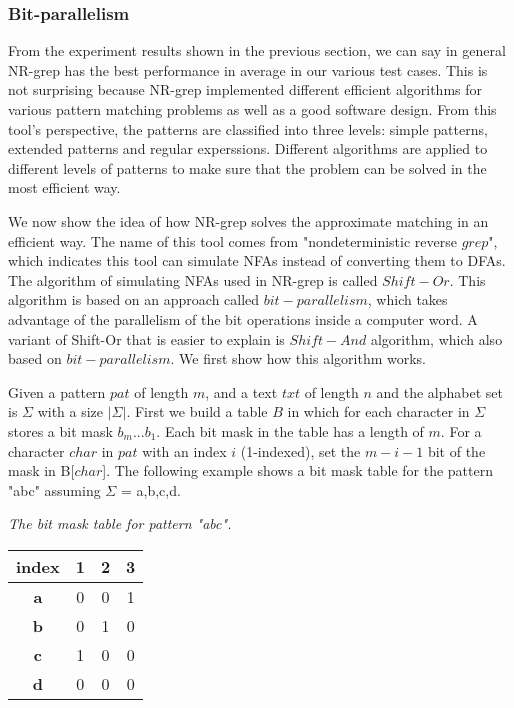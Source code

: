 \subsubsection{Bit-parallelism}
From the experiment results shown in the previous section, we can say in general NR-grep has the best performance in average in our various test cases. This is not surprising because NR-grep implemented different efficient algorithms for various pattern matching problems as well as a good software design. From this tool's perspective, the patterns are classified into three levels: simple patterns, extended patterns and regular experssions. Different algorithms are applied to different levels of patterns to make sure that the problem can be solved in the most efficient way. 

We now show the idea of how NR-grep solves the approximate matching in an efficient way. The name of this tool comes from "nondeterministic reverse $grep$", which indicates this tool can simulate NFAs instead of converting them to DFAs. The algorithm of  simulating NFAs used in NR-grep is called $Shift-Or$. This algorithm is based on an approach called $bit-parallelism$, which takes advantage of the parallelism of the bit operations inside a computer word. A variant of Shift-Or that is easier to explain is $Shift-And$ algorithm, which also based on $bit-parallelism$. We first show how this algorithm works. 

Given a pattern $pat$ of length $m$,  and a text $txt$ of length $n$ and the alphabet set is $\Sigma$ with a size $|\Sigma|$. First we build a table $B$ in which for each character in $\Sigma$ stores a bit mask $b_m...b_1$. Each bit mask in the table has a length of $m$. For a character $char$ in $pat$ with an index $i$ (1-indexed), set the $m-i-1$ bit of the mask in B[$char$]. The following example shows a bit mask table for the pattern "abc" assuming $\Sigma$ = {a,b,c,d}.


\begin{example}\emph{The bit mask table for pattern "abc".}

\begin{table}[H]
	\centering
	\begin{tabular}{|c|c|c|c|}
		\hline
		index      & 1                        & 2                        & 3                        \\ \hline
		\textbf{a} & 0                        & 0                        & {\color[HTML]{3531FF} 1} \\ \hline
		\textbf{b} & 0                        & {\color[HTML]{3531FF} 1} & 0                        \\ \hline
		\textbf{c} & {\color[HTML]{3531FF} 1} & 0                        & 0                        \\ \hline
		\textbf{d} & 0                        & 0                        & 0                        \\ \hline
	\end{tabular}
	\label{table-bitmask}
\end{table}
\end{example}

